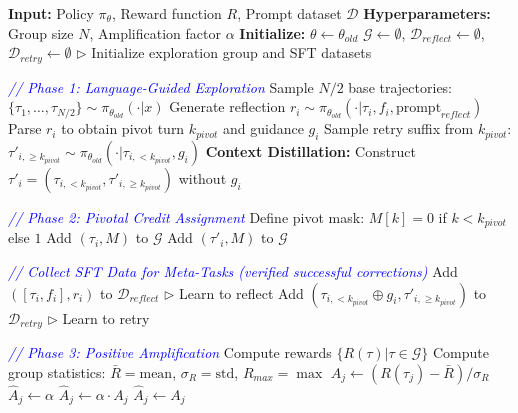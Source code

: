 \begin{algorithm*}[t]
\small
\caption{R$^3$L: Reflect-then-Retry Reinforcement Learning with Language-Guided Exploration, Pivotal Credit and Positive Amplification}
\label{alg:R3L}
\begin{algorithmic}[1]
\STATE \textbf{Input:} Policy $\pi_{\theta}$, Reward function $R$, Prompt dataset $\mathcal{D}$
\STATE \textbf{Hyperparameters:} Group size $N$, Amplification factor $\alpha$
\STATE \textbf{Initialize:} $\theta \leftarrow \theta_{old}$
        \STATE $\mathcal{G} \leftarrow \emptyset$, $\mathcal{D}_{reflect} \leftarrow \emptyset$, $\mathcal{D}_{retry} \leftarrow \emptyset$ \hfill $\triangleright$ Initialize exploration group and SFT datasets
        
        \STATE \textcolor{blue}{\textit{// Phase 1: Language-Guided Exploration}}
        \STATE Sample $N/2$ base trajectories: $\{\tau_1, \dots, \tau_{N/2}\} \sim \pi_{\theta_{old}}(\cdot|x)$
            \STATE Generate reflection $r_i \sim \pi_{\theta_{old}}(\cdot | \tau_i, f_i, \text{prompt}_{reflect})$
            \STATE Parse $r_i$ to obtain pivot turn $k_{pivot}$ and guidance $g_i$
            \STATE Sample retry suffix from $k_{pivot}$: $\tau'_{i,\geq k_{pivot}} \sim \pi_{\theta_{old}}(\cdot | \tau_{i,<k_{pivot}}, g_i)$
            \STATE \textbf{Context Distillation:} Construct $\tau'_i = (\tau_{i,<k_{pivot}}, \tau'_{i,\geq k_{pivot}})$ without $g_i$
            
            \STATE \textcolor{blue}{\textit{// Phase 2: Pivotal Credit Assignment}}
            \STATE Define pivot mask: $M[k] = 0$ if $k < k_{pivot}$ else $1$
            \STATE Add $(\tau_i, M)$ to $\mathcal{G}$
            \STATE Add $(\tau'_i, M)$ to $\mathcal{G}$
            
            \STATE \textcolor{blue}{\textit{// Collect SFT Data for Meta-Tasks (verified successful corrections)}}
                \STATE Add $([\tau_i, f_i], r_i)$ to $\mathcal{D}_{reflect}$ \hfill $\triangleright$ Learn to reflect
                \STATE Add $(\tau_{i,<k_{pivot}} \oplus g_i, \tau'_{i,\geq k_{pivot}})$ to $\mathcal{D}_{retry}$ \hfill $\triangleright$ Learn to retry
            \ENDIF
        \ENDFOR
        
        \STATE \textcolor{blue}{\textit{// Phase 3: Positive Amplification}}
        \STATE Compute rewards $\{R(\tau) | \tau \in \mathcal{G}\}$
        \STATE Compute group statistics: $\bar{R} = \text{mean}$, $\sigma_R = \text{std}$, $R_{max} = \max$
            \STATE $A_j \leftarrow (R(\tau_j) - \bar{R}) / \sigma_R$
                \STATE $\hat{A}_j \leftarrow \alpha$
                \STATE $\hat{A}_j \leftarrow \alpha \cdot A_j$
            \ELSE
                \STATE $\hat{A}_j \leftarrow A_j$
            \ENDIF
        \ENDFOR
        

\end{algorithmic}
\end{algorithm*}
